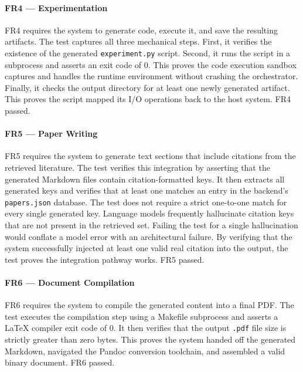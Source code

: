 \paragraph{FR4 — Experimentation}
FR4 requires the system to generate code, execute it, and save the resulting artifacts.
The test captures all three mechanical steps.
First, it verifies the existence of the generated \texttt{experiment.py} script.
Second, it runs the script in a subprocess and asserts an exit code of 0.
This proves the code execution sandbox captures and handles the runtime environment without crashing the orchestrator.
Finally, it checks the output directory for at least one newly generated artifact.
This proves the script mapped its I/O operations back to the host system.
FR4 passed.

\paragraph{FR5 — Paper Writing}
FR5 requires the system to generate text sections that include citations from the retrieved literature.
The test verifies this integration by asserting that the generated Markdown files contain citation-formatted keys.
It then extracts all generated keys and verifies that at least one matches an entry in the backend's \texttt{papers.json} database.
The test does not require a strict one-to-one match for every single generated key.
Language models frequently hallucinate citation keys that are not present in the retrieved set.
Failing the test for a single hallucination would conflate a model error with an architectural failure.
By verifying that the system successfully injected at least one valid real citation into the output, the test proves the integration pathway works.
FR5 passed.

\paragraph{FR6 — Document Compilation}
FR6 requires the system to compile the generated content into a final PDF.
The test executes the compilation step using a Makefile subprocess and asserts a \LaTeX{} compiler exit code of 0.
It then verifies that the output \texttt{.pdf} file size is strictly greater than zero bytes.
This proves the system handed off the generated Markdown, navigated the Pandoc conversion toolchain, and assembled a valid binary document.
FR6 passed.

